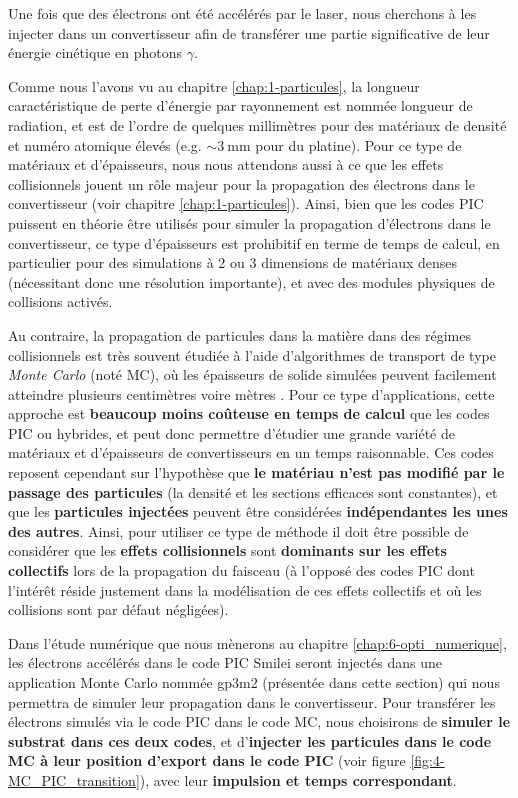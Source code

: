 \begin{refsection}
Une fois que des électrons ont été accélérés par le laser, nous cherchons à les injecter dans un convertisseur afin de transférer une partie significative de leur énergie cinétique en photons $\gamma$.

\newpage

Comme nous l'avons vu au chapitre \ref{chap:1-particules}, la longueur caractéristique de perte d'énergie par rayonnement est nommée longueur de radiation, et est de l'ordre de quelques millimètres pour des matériaux de densité et numéro atomique élevés (e.g. $\sim 3 ~ \si{\mm}$ pour du platine). Pour ce type de matériaux et d'épaisseurs, nous nous attendons aussi à ce que les effets collisionnels jouent un rôle majeur pour la propagation des électrons dans le convertisseur (voir chapitre \ref{chap:1-particules}).
Ainsi, bien que les codes PIC puissent en théorie être utilisés pour simuler la propagation d'électrons dans le convertisseur, ce type d'épaisseurs est prohibitif en terme de temps de calcul, en particulier pour des simulations à 2 ou 3 dimensions de matériaux denses (nécessitant donc une résolution importante), et avec des modules physiques de collisions activés.

Au contraire, la propagation de particules dans la matière dans des régimes collisionnels est très souvent étudiée à l'aide d'algorithmes de transport de type \textit{Monte Carlo} (noté MC), où les épaisseurs de solide simulées peuvent facilement atteindre plusieurs centimètres voire mètres \parencite{agostinelli_2003}. Pour ce type d'applications, cette approche est \textbf{beaucoup moins coûteuse en temps de calcul} que les codes PIC ou hybrides, et peut donc permettre d'étudier une grande variété de matériaux et d'épaisseurs de convertisseurs en un temps raisonnable. Ces codes reposent cependant sur l'hypothèse que \textbf{le matériau n'est pas modifié par le passage des particules} (la densité et les sections efficaces sont constantes), et que les \textbf{particules injectées} peuvent être considérées \textbf{indépendantes les unes des autres}. Ainsi, pour utiliser ce type de méthode il doit être possible de considérer que les \textbf{effets collisionnels} sont \textbf{dominants sur les effets collectifs} lors de la propagation du faisceau (à l'opposé des codes PIC dont l'intérêt réside justement dans la modélisation de ces effets collectifs et où les collisions sont par défaut négligées).

Dans l'étude numérique que nous mènerons au chapitre \ref{chap:6-opti_numerique}, les électrons accélérés dans le code PIC Smilei seront injectés dans une application Monte Carlo nommée gp3m2 (présentée dans cette section) qui nous permettra de simuler leur propagation dans le convertisseur. Pour transférer les électrons simulés via le code PIC dans le code MC, nous choisirons de \textbf{simuler le substrat dans ces deux codes}, et d'\textbf{injecter les particules dans le code MC à leur position d'export dans le code PIC} (voir figure \ref{fig:4-MC_PIC_transition}), avec leur \textbf{impulsion et temps correspondant}. 


\end{refsection}
